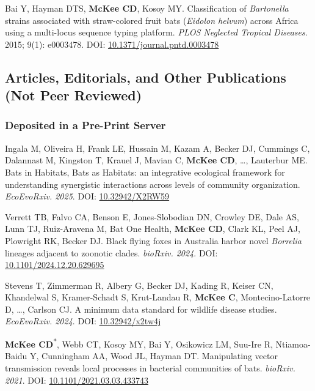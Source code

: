 \documentclass{cv}
\begin{document}
\begin{pubenum}
\item Bai Y, Hayman DTS, \textbf{McKee CD}, Kosoy MY. Classification of \textit{Bartonella} strains associated with straw-colored fruit bats (\textit{Eidolon helvum}) across Africa using a multi-locus sequence typing platform. \textit{PLOS Neglected Tropical Diseases}. 2015; 9(1): e0003478. DOI: \href{https://doi.org/10.1371/journal.pntd.0003478}{10.1371/journal.pntd.0003478}

\end{pubenum}

\subsection*{Articles, Editorials, and Other Publications (Not Peer Reviewed)}

\subsubsection*{Deposited in a Pre-Print Server}

\begin{pubenum}

\item Ingala M, Oliveira H, Frank LE, Hussain M, Kazam A, Becker DJ, Cummings C, Dalannast M, Kingston T, Krauel J, Mavian C, \textbf{McKee CD}, …, Lauterbur ME. Bats in Habitats, Bats as Habitats: an integrative ecological framework for understanding synergistic interactions across levels of community organization. \textit{EcoEvoRxiv. 2025}. DOI: \href{https://doi.org/10.32942/X2RW59}{10.32942/X2RW59}

\item Verrett TB, Falvo CA, Benson E, Jones-Slobodian DN, Crowley DE, Dale AS, Lunn TJ, Ruiz-Aravena M, Bat One Health, \textbf{McKee CD}, Clark KL, Peel AJ, Plowright RK, Becker DJ. Black flying foxes in Australia harbor novel \textit{Borrelia} lineages adjacent to zoonotic clades. \textit{bioRxiv. 2024}. DOI: \href{https://doi.org/10.1101/2024.12.20.629695}{10.1101/2024.12.20.629695}

\item Stevens T, Zimmerman R, Albery G, Becker DJ, Kading R, Keiser CN, Khandelwal S, Kramer-Schadt S, Krut-Landau R, \textbf{McKee C}, Montecino-Latorre D, …, Carlson CJ. A minimum data standard for wildlife disease studies. \textit{EcoEvoRxiv. 2024}. DOI: \href{https://doi.org/10.32942/x2tw4j}{10.32942/x2tw4j}

\item \textbf{McKee CD}\textsuperscript{*}, Webb CT, Kosoy MY, Bai Y, Osikowicz LM, Suu-Ire R, Ntiamoa-Baidu Y, Cunningham AA, Wood JL, Hayman DT. Manipulating vector transmission reveals local processes in bacterial communities of bats. \textit{bioRxiv. 2021}. DOI: \href{https://doi.org/10.1101/2021.03.03.433743}{10.1101/2021.03.03.433743}

 \end{pubenum}
\end{document}

